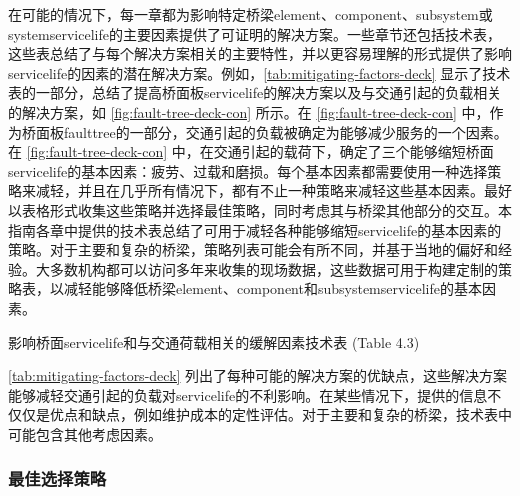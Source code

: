 在可能的情况下，每一章都为影响特定桥梁\gls{element}、\gls{component}、\gls{subsystem}或\gls{system}\gls{servicelife}的主要因素提供了可证明的解决方案。一些章节还包括技术表，这些表总结了与每个解决方案相关的主要特性，并以更容易理解的形式提供了影响\gls{servicelife}的因素的潜在解决方案。例如，\cref{tab:mitigating-factors-deck} 显示了技术表的一部分，总结了提高桥面板\gls{servicelife}的解决方案以及与交通引起的负载相关的解决方案，如 \cref{fig:fault-tree-deck-con} 所示。在 \cref{fig:fault-tree-deck-con} 中，作为桥面板\gls*{faulttree}的一部分，交通引起的负载被确定为能够减少服务的一个因素。在 \cref{fig:fault-tree-deck-con} 中，在交通引起的载荷下，确定了三个能够缩短桥面\gls{servicelife}的基本因素：疲劳、过载和磨损。每个基本因素都需要使用一种选择策略来减轻，并且在几乎所有情况下，都有不止一种策略来减轻这些基本因素。最好以表格形式收集这些策略并选择最佳策略，同时考虑其与桥梁其他部分的交互。本指南各章中提供的技术表总结了可用于减轻各种能够缩短\gls{servicelife}的基本因素的策略。对于主要和复杂的桥梁，策略列表可能会有所不同，并基于当地的偏好和经验。大多数机构都可以访问多年来收集的现场数据，这些数据可用于构建定制的策略表，以减轻能够降低桥梁\gls{element}、\gls{component}和\gls{subsystem}\gls{servicelife}的基本因素。

\begin{table}
  \caption{影响桥面\gls{servicelife}和与交通荷载相关的缓解因素技术表 (Table 4.3)}\label{tab:mitigating-factors-deck}
  
\end{table}


\cref{tab:mitigating-factors-deck} 列出了每种可能的解决方案的优缺点，这些解决方案能够减轻交通引起的负载对\gls{servicelife}的不利影响。在某些情况下，提供的信息不仅仅是优点和缺点，例如维护成本的定性评估。对于主要和复杂的桥梁，技术表中可能包含其他考虑因素。

\subsubsection*{最佳选择策略}

